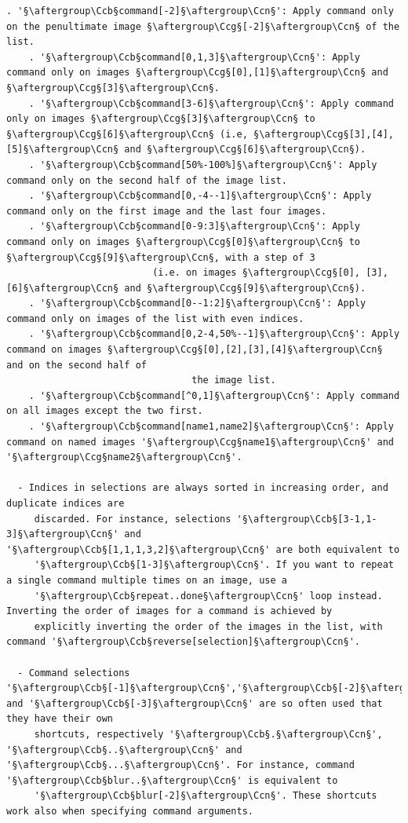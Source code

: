 \documentclass[a4paper,10.5pt,twoside]{book}
\def\Ccb{\color{cb}}
\def\Ccg{\color{cc}}
\def\Ccn{\color{black}}
\begin{document}
\begin{lstlisting}[escapechar=§]
    . '§\aftergroup\Ccb§command[-2]§\aftergroup\Ccn§': Apply command only on the penultimate image §\aftergroup\Ccg§[-2]§\aftergroup\Ccn§ of the list. 
    . '§\aftergroup\Ccb§command[0,1,3]§\aftergroup\Ccn§': Apply command only on images §\aftergroup\Ccg§[0],[1]§\aftergroup\Ccn§ and §\aftergroup\Ccg§[3]§\aftergroup\Ccn§. 
    . '§\aftergroup\Ccb§command[3-6]§\aftergroup\Ccn§': Apply command only on images §\aftergroup\Ccg§[3]§\aftergroup\Ccn§ to §\aftergroup\Ccg§[6]§\aftergroup\Ccn§ (i.e, §\aftergroup\Ccg§[3],[4],[5]§\aftergroup\Ccn§ and §\aftergroup\Ccg§[6]§\aftergroup\Ccn§). 
    . '§\aftergroup\Ccb§command[50%-100%]§\aftergroup\Ccn§': Apply command only on the second half of the image list. 
    . '§\aftergroup\Ccb§command[0,-4--1]§\aftergroup\Ccn§': Apply command only on the first image and the last four images. 
    . '§\aftergroup\Ccb§command[0-9:3]§\aftergroup\Ccn§': Apply command only on images §\aftergroup\Ccg§[0]§\aftergroup\Ccn§ to §\aftergroup\Ccg§[9]§\aftergroup\Ccn§, with a step of 3 
                          (i.e. on images §\aftergroup\Ccg§[0], [3], [6]§\aftergroup\Ccn§ and §\aftergroup\Ccg§[9]§\aftergroup\Ccn§). 
    . '§\aftergroup\Ccb§command[0--1:2]§\aftergroup\Ccn§': Apply command only on images of the list with even indices. 
    . '§\aftergroup\Ccb§command[0,2-4,50%--1]§\aftergroup\Ccn§': Apply command on images §\aftergroup\Ccg§[0],[2],[3],[4]§\aftergroup\Ccn§ and on the second half of 
                                 the image list. 
    . '§\aftergroup\Ccb§command[^0,1]§\aftergroup\Ccn§': Apply command on all images except the two first. 
    . '§\aftergroup\Ccb§command[name1,name2]§\aftergroup\Ccn§': Apply command on named images '§\aftergroup\Ccg§name1§\aftergroup\Ccn§' and '§\aftergroup\Ccg§name2§\aftergroup\Ccn§'. 
 
  - Indices in selections are always sorted in increasing order, and duplicate indices are 
     discarded. For instance, selections '§\aftergroup\Ccb§[3-1,1-3]§\aftergroup\Ccn§' and '§\aftergroup\Ccb§[1,1,1,3,2]§\aftergroup\Ccn§' are both equivalent to 
     '§\aftergroup\Ccb§[1-3]§\aftergroup\Ccn§'. If you want to repeat a single command multiple times on an image, use a 
     '§\aftergroup\Ccb§repeat..done§\aftergroup\Ccn§' loop instead. Inverting the order of images for a command is achieved by 
     explicitly inverting the order of the images in the list, with command '§\aftergroup\Ccb§reverse[selection]§\aftergroup\Ccn§'. 
 
  - Command selections '§\aftergroup\Ccb§[-1]§\aftergroup\Ccn§','§\aftergroup\Ccb§[-2]§\aftergroup\Ccn§' and '§\aftergroup\Ccb§[-3]§\aftergroup\Ccn§' are so often used that they have their own 
     shortcuts, respectively '§\aftergroup\Ccb§.§\aftergroup\Ccn§', '§\aftergroup\Ccb§..§\aftergroup\Ccn§' and '§\aftergroup\Ccb§...§\aftergroup\Ccn§'. For instance, command '§\aftergroup\Ccb§blur..§\aftergroup\Ccn§' is equivalent to 
     '§\aftergroup\Ccb§blur[-2]§\aftergroup\Ccn§'. These shortcuts work also when specifying command arguments. 
 

\end{lstlisting}
\end{document}
